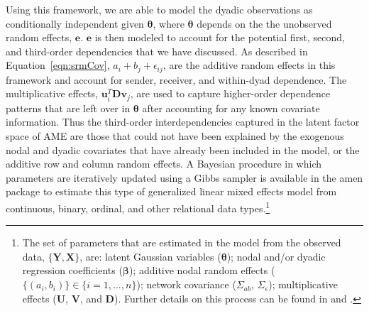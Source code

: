 \documentclass[12pt,onesided,pdflatex]{amsart}
\newcommand{\pkg}[1]{{\fontseries{b}\selectfont #1}}
\begin{document}
Using this framework, we are able to model the dyadic observations as conditionally independent given $\bm\theta$, where $\bm\theta$ depends on the the unobserved random effects, $\mathbf{e}$. $\mathbf{e}$ is then modeled to account for the potential first, second, and third-order dependencies that we have discussed. As described in Equation~\ref{eqn:srmCov}, $a_{i} + b_{j}  + \epsilon_{ij}$, are the additive random effects in this framework and account for sender, receiver, and within-dyad dependence. The multiplicative effects, $\textbf{u}_{i}^{T} \textbf{D} \textbf{v}_{j}$, are used to capture higher-order dependence patterns that are left over in $\bm\theta$ after accounting for any known covariate information. Thus the third-order interdependencies captured in the latent factor space of AME are those that could not have been explained by the exogenous nodal and dyadic covariates that have already been included in the model, or the additive row and column random effects. A Bayesian procedure in which parameters are iteratively updated using a Gibbs sampler is available in the \pkg{amen} package to estimate this type of generalized linear mixed effects model from continuous, binary, ordinal, and other relational data types.\footnote{The set of parameters that are estimated in the model from the observed data, $\{\mathbf{Y}, \mathbf{X}\}$, are: latent Gaussian variables ($\bm\theta$); nodal and/or dyadic regression coefficients ($\bm\beta$); additive nodal random effects ($\{(a_{i},b_{i})\} \in \{i=1, \ldots, n \}$); network covariance ($\Sigma_{ab},\, \Sigma_{\epsilon}$); multiplicative effects ($\mathbf{U}$, $\mathbf{V}$, and $\mathbf{D}$). Further details on this process can be found in \citet{hoff:2005} and \citet{hoff:2009}.}


% 
\end{document}
